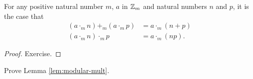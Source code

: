 \begin{lem}\label{lem:modular-mult}
	For any positive natural number $m$, $a$ in ${\mathbb Z}_m$ and natural numbers $n$ and $p$, it is the case that 
	\begin{align*} 
		(a \cdot_m n)+_m (a\cdot_m p) &= a\cdot_m (n+p)\\
		(a\cdot_m n)\cdot_m p &= a\cdot_m (np).
	\end{align*}

\begin{proof}
	Exercise.
\end{proof}
\end{lem}

\begin{exer}
	\begin{exercise}
		\item Prove Lemma \ref{lem:modular-mult}.
	\end{exercise}
\end{exer}




